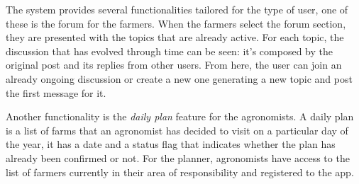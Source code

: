 \documentclass[table, 12pt]{article}
\begin{document}
The system provides several functionalities tailored for the type of user, one of these is the forum for the farmers. When the farmers select the forum section, they are presented with the topics that are already active. For each topic, the discussion that has evolved through time can be seen: it's composed by the original post and its replies from other users. From here, the user can join an already ongoing discussion or create a new one generating a new topic and post the first message for it.

Another functionality is the \textit{daily plan} feature for the agronomists.
A daily plan is a list of farms that an agronomist has decided to visit on a particular day of the year, it has a date and a status flag that indicates whether the plan has already been confirmed or not\footnotemark. %
For the planner, agronomists have access to the list of farmers currently in their area of responsibility and registered to the app.
\end{document}
